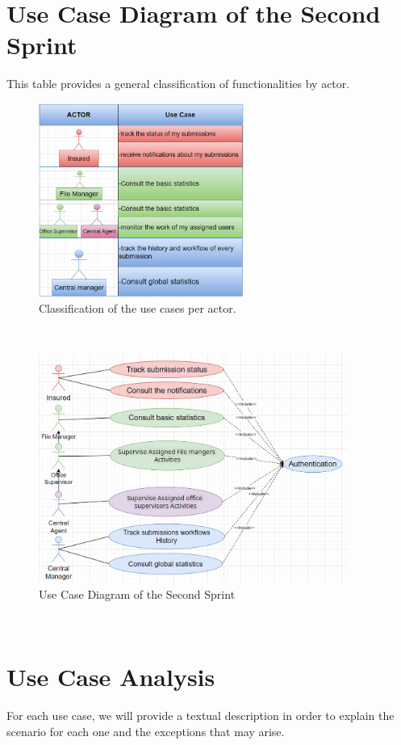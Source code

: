 \section{Use Case Diagram of the Second Sprint}
This table provides a general classification of functionalities by actor.
 \begin{figure}[h]
    \centering
    \includegraphics[width=0.6\textwidth]{figures/use case par acteur2.png}
    \caption{Classification of the use cases per actor.}
\end{figure}\
\begin{figure}[h!]
    \centering
    \includegraphics[width=0.9\textwidth]{figures/diagram use case s2.png}
    \caption{Use Case Diagram of the Second Sprint}
\end{figure}\
\newpage
\section{Use Case Analysis}
For each use case, we will provide a textual description in order to explain the scenario for each one and the exceptions that may arise.
